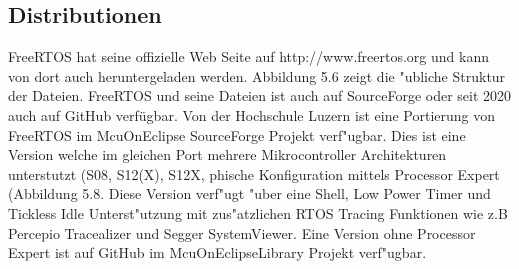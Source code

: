 \documentclass[a4paper, 8pt]{extarticle}
\begin{document}
\begin{multicols*}{3}
			\subsection{Distributionen}
			FreeRTOS hat seine offizielle Web Seite auf http://www.freertos.org und kann
			von dort auch heruntergeladen werden. Abbildung 5.6 zeigt die "ubliche Struktur
			der Dateien. FreeRTOS und seine Dateien ist auch auf SourceForge oder seit
			2020 auch auf GitHub verfügbar.
			Von der Hochschule Luzern ist eine Portierung von FreeRTOS im McuOnEclipse SourceForge Projekt verf"ugbar. Dies ist eine Version welche im gleichen 
			Port mehrere Mikrocontroller Architekturen unterstutzt (S08, S12(X), S12X,
			phische Konfiguration mittels Processor Expert (Abbildung 5.8. Diese Version
			verf"ugt "uber eine Shell, Low Power Timer und Tickless Idle Unterst"utzung mit
			zus"atzlichen RTOS Tracing Funktionen wie z.B Percepio Tracealizer und Segger
			SystemViewer. Eine Version ohne Processor Expert ist auf GitHub im McuOnEclipseLibrary Projekt verf"ugbar.

\end{multicols*}
\end{document}

